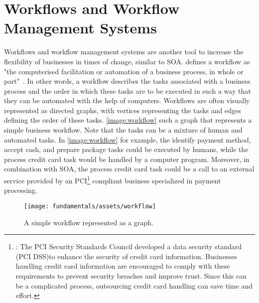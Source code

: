 \section{Workflows and Workflow Management Systems}

Workflows and workflow management systems are another tool to increase the flexibility of businesses in times of change, similar to SOA.
\citeauthor*{workflow:referencemodel} defines a workflow as "the computerised facilitation or automation of a business process, in whole or part"~\autocite{workflow:referencemodel}.
In other words, a workflow describes the tasks associated with a business process and the order in which these tasks are to be executed in such a way that they can be automated with the help of computers.
Workflows are often visually represented as directed graphs, with vertices representing the tasks and edges defining the order of these tasks.
\autoref{image:workflow} such a graph that represents a simple business workflow.
Note that the tasks can be a mixture of human and automated tasks.
In \autoref{image:workflow} for example, the identify payment method, accept cash, and prepare package tasks could be executed by humans, while the process credit card task would be handled by a computer program.
Moreover, in combination with SOA, the process credit card task could be a call to an external service provided by an PCI\footnote{: The PCI Security Standards Council developed a data security standard (PCI DSS)\footnotemark to enhance the security of credit card information. Businesses handling credit card information are encouraged to comply with these requirements to prevent security breaches and improve trust. Since this can be a complicated process, outsourcing credit card handling can save time and effort.} compliant business specialized in payment processing.


\begin{figure}[!htbp]
	\centering
	\texttt{[image: fundamentals/assets/workflow]}
	\caption{A simple workflow represented as a graph.}
	\label{image:workflow}
\end{figure}

